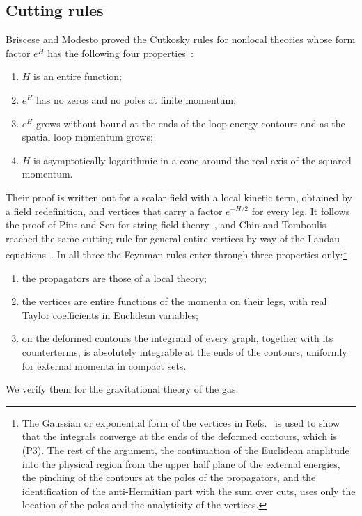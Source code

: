 \documentclass[a4paper,11pt]{article}
\begin{document}
\subsection{Cutting rules}
\label{sec:cutkosky}

Briscese and Modesto proved the Cutkosky rules for nonlocal theories whose form factor $e^{H}$ has the following four properties~\cite{BrisceseModesto2019}:
\begin{enumerate}[label=\textup{(U\arabic*)},leftmargin=2.4em,itemsep=0.15em]
\item $H$ is an entire function;
\item $e^{H}$ has no zeros and no poles at finite momentum;
\item $e^{H}$ grows without bound at the ends of the loop-energy contours and as the spatial loop momentum grows;
\item $H$ is asymptotically logarithmic in a cone around the real axis of the squared momentum.
\end{enumerate}
Their proof is written out for a scalar field with a local kinetic term, obtained by a field redefinition, and vertices that carry a factor $e^{-H/2}$ for every leg. It follows the proof of Pius and Sen for string field theory~\cite{PiusSen2016}, and Chin and Tomboulis reached the same cutting rule for general entire vertices by way of the Landau equations~\cite{ChinTomboulis2018}. In all three the Feynman rules enter through three properties only:\footnote{The Gaussian or exponential form of the vertices in Refs.~\cite{PiusSen2016,BrisceseModesto2019} is used to show that the integrals converge at the ends of the deformed contours, which is (P3). The rest of the argument, the continuation of the Euclidean amplitude into the physical region from the upper half plane of the external energies, the pinching of the contours at the poles of the propagators, and the identification of the anti-Hermitian part with the sum over cuts, uses only the location of the poles and the analyticity of the vertices.}
\begin{enumerate}[label=\textup{(P\arabic*)},leftmargin=2.4em,itemsep=0.15em]
\item the propagators are those of a local theory;
\item the vertices are entire functions of the momenta on their legs, with real Taylor coefficients in Euclidean variables;
\item on the deformed contours the integrand of every graph, together with its counterterms, is absolutely integrable at the ends of the contours, uniformly for external momenta in compact sets.
\end{enumerate}
We verify them for the gravitational theory of the gas.
\end{document}
